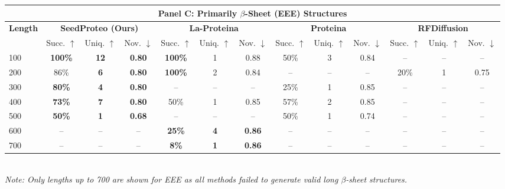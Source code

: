 \begin{table}[p]
{\begin{tabular}{l | ccc | ccc | ccc | ccc}
        \midrule
        \multicolumn{13}{c}{\large \textbf{Panel C: Primarily $\beta$-Sheet (EEE) Structures}} \\
        \midrule
        \multirow{2}{*}{\textbf{Length}} & \multicolumn{3}{c|}{\textbf{SeedProteo (Ours)}} & \multicolumn{3}{c|}{\textbf{La-Proteina}} & \multicolumn{3}{c|}{\textbf{Proteina}} & \multicolumn{3}{c}{\textbf{RFDiffusion}} \\
        \cmidrule(lr){2-4} \cmidrule(lr){5-7} \cmidrule(lr){8-10} \cmidrule(lr){11-13}
         & Succ. $\uparrow$ & Uniq. $\uparrow$ & Nov. $\downarrow$ & Succ. $\uparrow$ & Uniq. $\uparrow$ & Nov. $\downarrow$ & Succ. $\uparrow$ & Uniq. $\uparrow$ & Nov. $\downarrow$ & Succ. $\uparrow$ & Uniq. $\uparrow$ & Nov. $\downarrow$ \\
        \midrule
        100 & \textbf{100\%} & \textbf{12} & \textbf{0.80} & \textbf{100\%} & 1 & 0.88 & 50\% & 3 & 0.84 & -- & -- & -- \\
        200 & 86\% & \textbf{6} & \textbf{0.80} & \textbf{100\%} & 2 & 0.84 & -- & -- & -- & 20\% & 1 & 0.75 \\
        300 & \textbf{80\%} & \textbf{4} & \textbf{0.80} & -- & -- & -- & 25\% & 1 & 0.85 & -- & -- & -- \\
        400 & \textbf{73\%} & \textbf{7} & \textbf{0.80} & 50\% & 1 & 0.85 & 57\% & 2 & 0.85 & -- & -- & -- \\
        500 & \textbf{50\%} & \textbf{1} & \textbf{0.68} & -- & -- & -- & 50\% & 1 & 0.74 & -- & -- & -- \\
        600 & -- & -- & -- & \textbf{25\%} & \textbf{4} & \textbf{0.86} & -- & -- & -- & -- & -- & -- \\
        700 & -- & -- & -- & \textbf{8\%} & \textbf{1} & \textbf{0.86} & -- & -- & -- & -- & -- & -- \\
        \bottomrule
    \end{tabular}%
    }
    \vspace{0.5em}
    \\
    \footnotesize{\textit{Note: Only lengths up to 700 are shown for EEE as all methods failed to generate valid long $\beta$-sheet structures.}}
\end{table}
